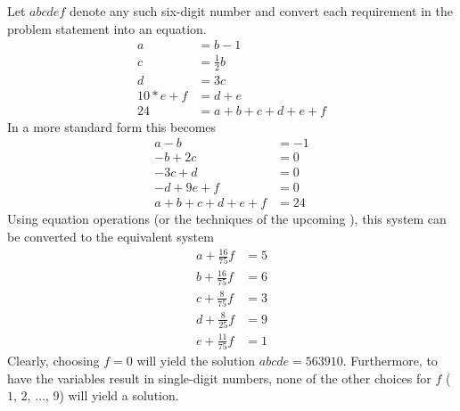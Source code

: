 Let $abcdef$ denote any such six-digit number and convert each requirement in the problem statement into an equation.
%
\begin{align*}
a&=b-1\\
c&=\frac{1}{2}b\\
d&=3c\\
10*e+f&=d+e\\
24&=a+b+c+d+e+f
\end{align*}
%
In a more standard form this becomes
%
\begin{align*}
a-b&=-1\\
-b+2c&=0\\
-3c+d&=0\\
-d+9e+f&=0\\
a+b+c+d+e+f&=24
\end{align*}
%
Using equation operations (or the techniques of the upcoming ), this system can be converted to the equivalent system
%
\begin{align*}
a+\frac{16}{75}f &= 5\\
b+\frac{16}{75}f &= 6\\
c+ \frac{8}{75}f &= 3\\
d+ \frac{8}{25}f &= 9\\
e+\frac{11}{75}f &= 1
\end{align*}
%
Clearly, choosing $f=0$ will yield the solution $abcde=563910$.  Furthermore, to have the variables result in single-digit numbers, none of the other choices for $f$ ($1,\,2,\,\ldots,\,9$) will yield a solution.